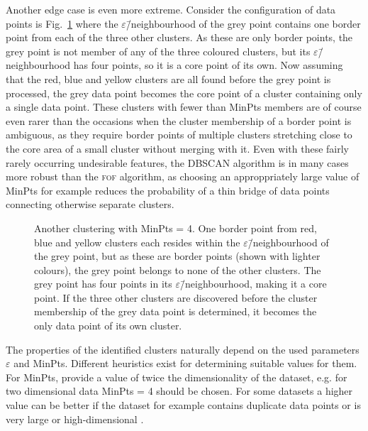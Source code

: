 \documentclass[english, twoside]{HYgradu}
\begin{document}
Another edge case is even more extreme. Consider the configuration of data points is Fig.\ \ref{fig:DBSCAN-singlecore} where the $\varepsilon$\=/neighbourhood of the grey point contains one border point from each of the three other clusters. As these are only border points, the grey point is not member of any of the three coloured clusters, but its $\varepsilon$\=/neighbourhood has four points, so it is a core point of its own. Now assuming that the red, blue and yellow clusters are all found before the grey point is processed, the grey data point becomes the core point of a cluster containing only a single data point. These clusters with fewer than MinPts members are of course even rarer than the occasions when the cluster membership of a border point is ambiguous, as they require border points of multiple clusters stretching close to the core area of a small cluster without merging with it. Even with these fairly rarely occurring undesirable features, the DBSCAN algorithm is in many cases more robust than the \textsc{fof} algorithm, as choosing an approppriately large value of MinPts for example reduces the probability of a thin bridge of data points connecting otherwise separate clusters.

\begin{figure}
    \centering
    
    \caption{Another clustering with MinPts = 4. One border point from red, blue and yellow clusters each resides within the $\varepsilon$\=/neighbourhood of the grey point, but as these are border points (shown with lighter colours), the grey point belongs to none of the other clusters. The grey point has four points in its $\varepsilon$\=/neighbourhood, making it a core point. If the three other clusters are discovered before the cluster membership of the grey data point is determined, it becomes the only data point of its own cluster.}\label{fig:DBSCAN-singlecore}
\end{figure}

The properties of the identified clusters naturally depend on the used parameters $\varepsilon$ and MinPts. Different heuristics exist for determining suitable values for them. For MinPts, \citet{schubert2017dbscan} provide a value of twice the dimensionality of the dataset, e.g. for two dimensional data MinPts = 4 should be chosen. For some datasets a higher value can be better if the dataset for example contains duplicate data points or is very large or high-dimensional \citep{schubert2017dbscan}.
\end{document}
